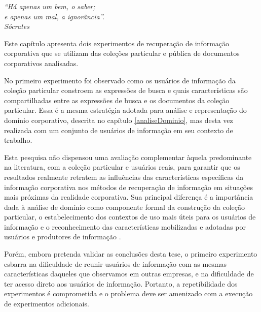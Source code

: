 
	\begin{flushright}
		\textit{``Há apenas um bem, o saber; \\e apenas um mal, a ignorância''.\\
		Sócrates}
	\end{flushright}


Este capítulo apresenta dois experimentos de recuperação de informação corporativa que se utilizam das coleções particular e pública de documentos corporativos analisadas. 

No primeiro experimento foi observado como os usuários de informação da coleção particular constroem as expressões de busca e quais características são compartilhadas entre as expressões de busca e os documentos da coleção particular. Essa é a mesma estratégia adotada para análise e representação do domínio corporativo, descrita no capítulo \ref{analiseDominio}, mas desta vez realizada com um conjunto de usuários de informação em seu contexto de trabalho.

Esta pesquisa não dispensou uma avaliação complementar àquela predominante na literatura, com a coleção particular e usuários reais, para garantir que os resultados realmente retratem as influências das características específicas da informação corporativa nos métodos de recuperação de informação em situações mais próximas da realidade corporativa. Sua principal diferença é a importância dada à análise de domínio como componente formal da construção da coleção particular, o estabelecimento dos contextos de uso mais úteis para os usuários de informação e o reconhecimento das características mobilizadas e adotadas por usuários e produtores de informação \cite{lykke2011domain}.

Porém, embora pretenda validar as conclusões desta tese, o primeiro experimento esbarra na dificuldade de reunir usuários de informação com as mesmas características daqueles que observamos em outras empresas, e na dificuldade de ter acesso direto aos usuários de informação. Portanto, a repetibilidade dos experimentos é comprometida e o problema deve ser amenizado com a execução de experimentos adicionais.

